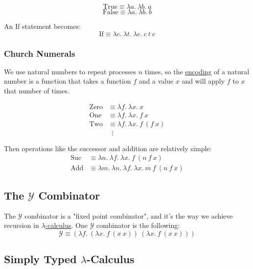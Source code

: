\documentclass{article}
\begin{document}
\[\text{True} \equiv \lambda a. \: \lambda b. \: a\]
\[\text{False} \equiv \lambda a. \: \lambda b. \: b\]

An If statement becomes:
\[\text{If} \equiv \lambda c. \: \lambda t. \: \lambda e. \: c\:t\:e\]

\subsubsection{Church Numerals}\label{church-numeral}
We use natural numbers to repeat processes $n$ times, so the \hyperref[church-encoding]{encoding} of a natural number is a function that takes a function $f$ and a value $x$ and will apply $f$ to $x$ that number of times.

\begin{equation}
\begin{aligned}
    \text{Zero} &\equiv \lambda f. \: \lambda x. \: x \nonumber \\
    \text{One}  &\equiv \lambda f. \: \lambda x. \: f \: x \nonumber \\
    \text{Two}  &\equiv \lambda f. \: \lambda x. \: f \: (f \: x) \nonumber \\
                &\;\;\vdots
\end{aligned}
\end{equation}

Then operations like the successor and addition are relatively simple:
\begin{equation}
\begin{aligned}
    \text{Suc} &\equiv \lambda n. \: \lambda f. \: \lambda x. \: f \: (n\:f\:x) \nonumber \\
    \text{Add}  &\equiv \lambda m. \: \lambda n. \: \lambda f. \: \lambda x. \: m \: f \: (n \: f \: x) \nonumber
\end{aligned}
\end{equation}

\subsection{The $\mathcal{Y}$ Combinator}\label{y-combinator}
The $\mathcal{Y}$ combinator is a "fixed point combinator", and it's the way we achieve recursion in \hyperref[lambda-calculus]{$\lambda$-calculus}. One $\mathcal{Y}$ combinator is the following:
\[\mathcal{Y} \equiv (\lambda f. \: (\lambda x. \: f \: (x \: x)) \: (\lambda x. \: f \: (x \: x)))\]


\subsection{Simply Typed $\lambda$-Calculus}
\end{document}
